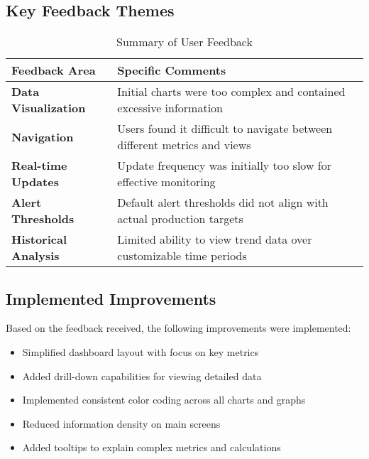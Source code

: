 \documentclass[11pt,a4paper]{article}
\begin{document}
\subsection{Key Feedback Themes}

\begin{table}[H]
    \centering
    \begin{tabular}{>{\bfseries}p{3cm}p{9cm}}
        \toprule
        \textbf{Feedback Area} & \textbf{Specific Comments} \\
        \midrule
        Data Visualization & Initial charts were too complex and contained excessive information \\
        \addlinespace
        Navigation & Users found it difficult to navigate between different metrics and views \\
        \addlinespace
        Real-time Updates & Update frequency was initially too slow for effective monitoring \\
        \addlinespace
        Alert Thresholds & Default alert thresholds did not align with actual production targets \\
        \addlinespace
        Historical Analysis & Limited ability to view trend data over customizable time periods \\
        \bottomrule
    \end{tabular}
    \caption{Summary of User Feedback}
    \label{tab:feedback}
\end{table}

\subsection{Implemented Improvements}

Based on the feedback received, the following improvements were implemented:

\begin{tcolorbox}[colback=tulipgreen!5,colframe=tulipgreen,title=Visualization Improvements]
    \begin{itemize}
        \item Simplified dashboard layout with focus on key metrics
        \item Added drill-down capabilities for viewing detailed data
        \item Implemented consistent color coding across all charts and graphs
        \item Reduced information density on main screens
        \item Added tooltips to explain complex metrics and calculations
    \end{itemize}
\end{tcolorbox}
\end{document}
